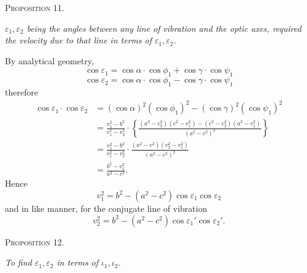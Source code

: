 \documentclass[11pt]{article}
\newcommand{\proposition}[1]{\vspace{0.9em}\begin{center}{\scshape Proposition #1.}\end{center}\vspace{0.2em}}
\newcommand{\sourcepage}[1]{\marginpar{\scriptsize p.~#1}}
\begin{document}
\proposition{11}

\emph{$\varepsilon_1,\varepsilon_2$ being the angles between any line of vibration and the optic axes, required the velocity due to that line in terms of $\varepsilon_1,\varepsilon_2$.}

By analytical geometry,
\[
 \cos\varepsilon_1=\cos\alpha\cdot\cos\phi_1+\cos\gamma\cdot\cos\psi_1
\]
\[
 \cos\varepsilon_2=\cos\alpha\cdot\cos\phi_1-\cos\gamma\cdot\cos\psi_1
\]
therefore
\begin{align*}
\cos\varepsilon_1\cdot\cos\varepsilon_2
&=(\cos\alpha)^2(\cos\phi_1)^2-(\cos\gamma)^2(\cos\psi_1)^2\\
&=\frac{v_1^2-b^2}{v_1^2-v_2^2}\cdot
\left\{\frac{(a^2-v_2^2)(c^2-v_1^2)-(c^2-v_2^2)(a^2-v_1^2)}{(a^2-c^2)^2}\right\}\\
&=\frac{v_1^2-b^2}{v_1^2-v_2^2}\cdot
\frac{(a^2-c^2)(v_2^2-v_1^2)}{(a^2-c^2)^2}\\
&=\frac{b^2-v_1^2}{a^2-c^2}.
\end{align*}
Hence
\[
 v_1^2=b^2-(a^2-c^2)\cos\varepsilon_1\cos\varepsilon_2
\]
and in like manner, for the conjugate line of vibration
\[
 v_2^2=b^2-(a^2-c^2)\cos\varepsilon_1'\cos\varepsilon_2'.
\]

\sourcepage{12}
\proposition{12}

\emph{To find $\varepsilon_1,\varepsilon_2$ in terms of $\iota_1,\iota_2$.}
\end{document}
